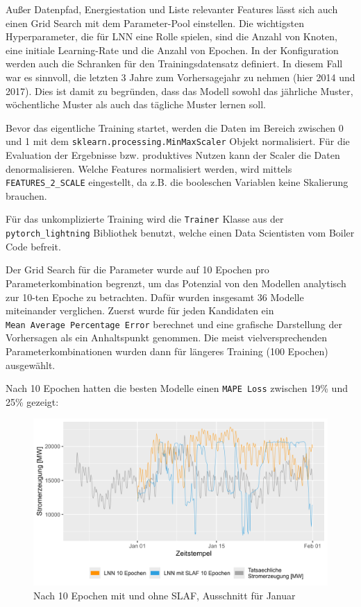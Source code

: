 \documentclass[11pt,ngerman,a4paper,]{article}
\begin{document}
Außer Datenpfad, Energiestation und Liste relevanter Features lässt sich auch einen Grid Search mit dem Parameter-Pool einstellen. Die wichtigsten Hyperparameter, die für LNN eine Rolle spielen, sind die Anzahl von Knoten, eine initiale Learning-Rate und die Anzahl von Epochen.
In der Konfiguration werden auch die Schranken für den Trainingsdatensatz definiert. In diesem Fall war es sinnvoll, die letzten 3 Jahre zum Vorhersagejahr zu nehmen (hier 2014 und 2017). Dies ist damit zu begründen, dass das Modell sowohl das jährliche Muster, wöchentliche Muster als auch das tägliche Muster lernen soll.

Bevor das eigentliche Training startet, werden die Daten im Bereich zwischen 0 und 1 mit dem \texttt{sklearn.processing.MinMaxScaler} Objekt normalisiert. Für die Evaluation der Ergebnisse bzw. produktives Nutzen kann der Scaler die Daten denormalisieren. Welche Features normalisiert werden, wird mittels \texttt{FEATURES\_2\_SCALE} eingestellt, da z.B. die booleschen Variablen keine Skalierung brauchen.

Für das unkomplizierte Training wird die \texttt{Trainer} Klasse aus der \texttt{pytorch\_lightning} Bibliothek benutzt, welche einen Data Scientisten vom Boiler Code befreit.

Der Grid Search für die Parameter wurde auf 10 Epochen pro Parameterkombination begrenzt, um das Potenzial von den Modellen analytisch zur 10-ten Epoche zu betrachten. Dafür wurden insgesamt 36 Modelle miteinander verglichen. Zuerst wurde für jeden Kandidaten ein \texttt{Mean\ Average\ Percentage\ Error} berechnet und eine grafische Darstellung der Vorhersagen als ein Anhaltspunkt genommen. Die meist vielversprechenden Parameterkombinationen wurden dann für längeres Training (100 Epochen) ausgewählt.

Nach 10 Epochen hatten die besten Modelle einen \texttt{MAPE\ Loss} zwischen 19\% und 25\% gezeigt:

\begin{figure}[H]
\centering
\includegraphics[width=1.0\textwidth]{plots/10_epochs_cobmined_nnLNN mit SLAF 10 Epochen.png}
\caption{Nach 10 Epochen mit und ohne SLAF, Ausschnitt für Januar}
\label{fig:slaf_lnn_10_epochs_january}
\end{figure}
\end{document}
